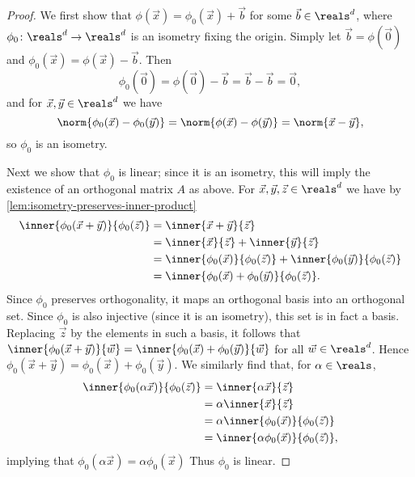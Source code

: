 \documentclass[article, a4paper, 11pt, oneside]{memoir}
\numberwithin{equation}{chapter}
\begin{document}
\begin{proof}
    We first show that $\phi(\vec{x}) = \phi_0(\vec{x}) + \vec{b}$ for some $\vec{b} \in \reals^d$, where $\phi_0 \colon \reals^d \to \reals^d$ is an isometry fixing the origin. Simply let $\vec{b} = \phi(\vec{0})$ and $\phi_0(\vec{x}) = \phi(\vec{x}) - \vec{b}$. Then
    \begin{equation*}
        \phi_0(\vec{0})
            = \phi(\vec{0}) - \vec{b}
            = \vec{b} - \vec{b}
            = \vec{0},
    \end{equation*}
    and for $\vec{x}, \vec{y} \in \reals^d$ we have
    \begin{equation*}
        \norm{ \phi_0(\vec{x}) - \phi_0(\vec{y}) }
            = \norm{ \phi(\vec{x}) - \phi(\vec{y}) }
            = \norm{\vec{x} - \vec{y}},
    \end{equation*}
    so $\phi_0$ is an isometry.

    Next we show that $\phi_0$ is linear; since it is an isometry, this will imply the existence of an orthogonal matrix $A$ as above. For $\vec{x}, \vec{y}, \vec{z} \in \reals^d$ we have by \cref{lem:isometry-preserves-inner-product}
    \begin{align*}
        \inner{ \phi_0(\vec{x} + \vec{y}) }{ \phi_0(\vec{z}) }
            &= \inner{ \vec{x} + \vec{y} }{ \vec{z} } \\
            &= \inner{ \vec{x} }{ \vec{z} } + \inner{ \vec{y} }{ \vec{z} } \\
            &= \inner{ \phi_0(\vec{x}) }{ \phi_0(\vec{z}) } + \inner{ \phi_0(\vec{y}) }{ \phi_0(\vec{z}) } \\
            &= \inner{ \phi_0(\vec{x}) + \phi_0(\vec{y}) }{ \phi_0(\vec{z}) }.
    \end{align*}
    Since $\phi_0$ preserves orthogonality, it maps an orthogonal basis into an orthogonal set. Since $\phi_0$ is also injective (since it is an isometry), this set is in fact a basis. Replacing $\vec{z}$ by the elements in such a basis, it follows that $\inner{ \phi_0(\vec{x} + \vec{y}) }{ \vec{w} } = \inner{ \phi_0(\vec{x}) + \phi_0(\vec{y}) }{ \vec{w} }$ for all $\vec{w} \in \reals^d$. Hence $\phi_0(\vec{x} + \vec{y}) = \phi_0(\vec{x}) + \phi_0(\vec{y})$. We similarly find that, for $\alpha \in \reals$,
    \begin{align*}
        \inner{ \phi_0(\alpha \vec{x}) }{ \phi_0(\vec{z}) }
            &= \inner{ \alpha \vec{x} }{ \vec{z} } \\
            &= \alpha \inner{ \vec{x} }{ \vec{z} } \\
            &= \alpha \inner{ \phi_0(\vec{x}) }{ \phi_0(\vec{z}) } \\
            &= \inner{ \alpha \phi_0(\vec{x}) }{ \phi_0(\vec{z}) },
    \end{align*}
    implying that $\phi_0(\alpha \vec{x}) = \alpha \phi_0(\vec{x})$ Thus $\phi_0$ is linear.


\end{proof}
\end{document}

